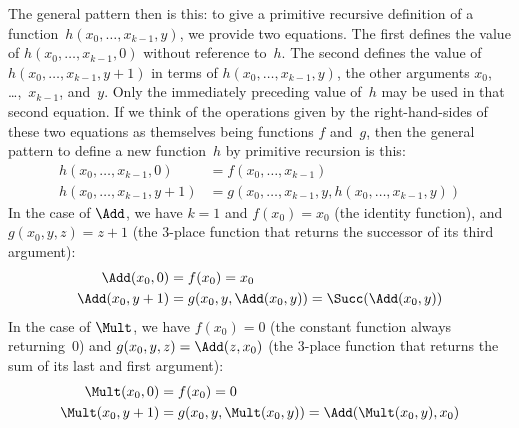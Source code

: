 \documentclass[../../../include/open-logic-section]{subfiles}
\begin{document}
The general pattern then is this: to give a primitive recursive
definition of a function~$h(x_0, \dots, x_{k-1}, y)$, we provide two
equations. The first defines the value of $h(x_0, \dots, x_{k-1}, 0)$
without reference to~$h$. The second defines the value of $h(x_0,
\dots, x_{k-1}, y+1)$ in terms of $h(x_0, \dots, x_{k-1}, y)$, the
other arguments $x_0$, \dots,~$x_{k-1}$, and~$y$. Only the immediately
preceding value of~$h$ may be used in that second equation.  If we
think of the operations given by the right-hand-sides of these two
equations as themselves being functions $f$ and~$g$, then the general
pattern to define a new function~$h$ by primitive recursion is this:
\begin{align*}
  h(x_0, \dots, x_{k-1}, 0) & = f(x_0, \dots, x_{k-1})\\
  h(x_0, \dots, x_{k-1}, y+1) & =
  g(x_0, \dots, x_{k-1}, y, h(x_0, \dots, x_{k-1}, y))
\end{align*}  
In the case of $\Add$, we have $k=1$ and $f(x_0) = x_0$ (the
identity function), and $g(x_0, y, z) = z + 1$ (the $3$-place function
that returns the successor of its third argument):
\begin{align*}
  \Add(x_0, 0) & = f(x_0) = x_0\\
  \Add(x_0, y+1) & = g(x_0, y, \Add(x_0, y)) =
  \Succ(\Add(x_0, y))
\end{align*}
In the case of $\Mult$, we have $f(x_0) = 0$ (the constant
function always returning~$0$) and $g(x_0, y, z) = \Add(z,x_0)$
(the $3$-place function that returns the sum of its last and first
argument):
\begin{align*}
  \Mult(x_0,0) & =  f(x_0) = 0 \\
  \Mult(x_0,y+1) & =  g(x_0, y, \Mult(x_0,y)) =
  \Add(\Mult(x_0,y), x_0)
\end{align*}
\end{document}
